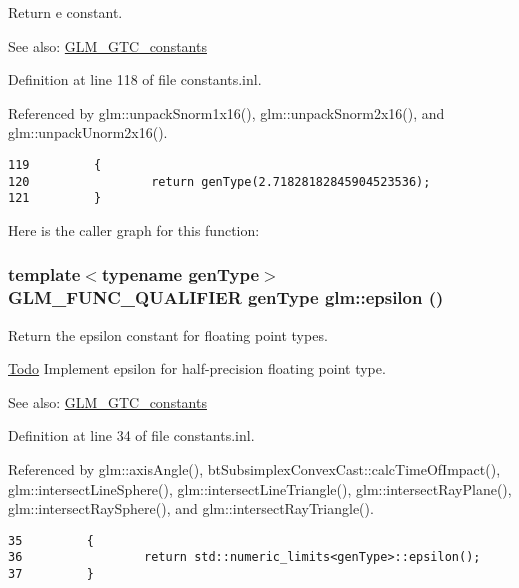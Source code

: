 Return e constant. \begin{Desc}
\item[See also:]\hyperlink{group__gtc__constants}{GLM\_\-GTC\_\-constants} \end{Desc}


Definition at line 118 of file constants.inl.

Referenced by glm::unpackSnorm1x16(), glm::unpackSnorm2x16(), and glm::unpackUnorm2x16().

\begin{Code}\begin{verbatim}119         {
120                 return genType(2.71828182845904523536);
121         }
\end{verbatim}
\end{Code}




Here is the caller graph for this function:\hypertarget{group__gtc__constants_g136c74927d8ab624f3c008bcd8c4445b}{
\subsubsection[epsilon]{\setlength{\rightskip}{0pt plus 5cm}template$<$typename genType$>$ GLM\_\-FUNC\_\-QUALIFIER genType glm::epsilon ()}}
\label{group__gtc__constants_g136c74927d8ab624f3c008bcd8c4445b}


Return the epsilon constant for floating point types. \begin{Desc}
\item[\hyperlink{todo__todo000051}{Todo}]Implement epsilon for half-precision floating point type. \end{Desc}
\begin{Desc}
\item[See also:]\hyperlink{group__gtc__constants}{GLM\_\-GTC\_\-constants} \end{Desc}


Definition at line 34 of file constants.inl.

Referenced by glm::axisAngle(), btSubsimplexConvexCast::calcTimeOfImpact(), glm::intersectLineSphere(), glm::intersectLineTriangle(), glm::intersectRayPlane(), glm::intersectRaySphere(), and glm::intersectRayTriangle().

\begin{Code}\begin{verbatim}35         {
36                 return std::numeric_limits<genType>::epsilon();
37         }
\end{verbatim}
\end{Code}




